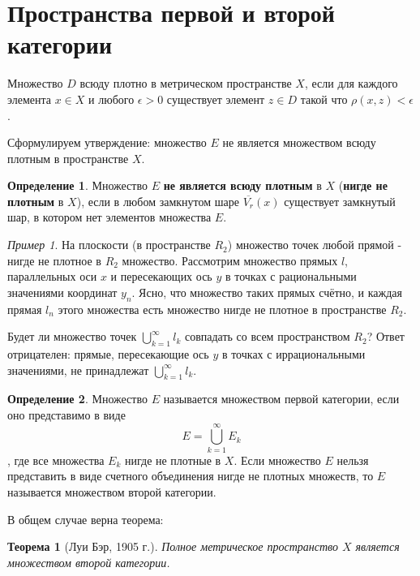 \documentclass[12pt,a4paper,titlepage]{book}
\theoremstyle{definition}
\newtheorem*{definition}{Определение}
\theoremstyle{plain}
\newtheorem*{theorem}{Теорема}
\theoremstyle{remark}
\theoremstyle{remark}
\newtheorem*{example}{Пример}
\theoremstyle{remark}
\theoremstyle{plain}
\begin{document}
\section{Пространства первой и второй категории}

Множество $D$ всюду плотно в метрическом пространстве $X$, если для каждого элемента $x \in X$ и любого $\epsilon > 0$ существует элемент $z \in D$ такой что
$\rho(x,z) < \epsilon$.

Сформулируем утверждение: множество $E$ не является множеством всюду плотным в пространстве $X$.

\begin{definition}
Множество $E$ \textbf{не является всюду плотным} в $X$ (\textbf{нигде не плотным} в $X$), если в любом замкнутом шаре $\overline{V_r}(x)$ существует замкнутый шар, в котором нет элементов множества $E$.
\end{definition}

\begin{example}
На плоскости (в пространстве $R_2$) множество точек любой прямой - нигде не плотное в $R_2$ множество.
Рассмотрим множество прямых $l$, параллельных оси $x$ и пересекающих ось $y$ в точках с рациональными значениями координат $y_n$. Ясно, что множество таких прямых счётно, и каждая прямая $l_n$ этого множества есть множество нигде не плотное в пространстве $R_2$.
\end{example}

Будет ли множество точек $\bigcup\limits_{k=1}^\infty l_k$ совпадать со всем пространством $R_2$? Ответ отрицателен: прямые, пересекающие ось $y$ в точках с иррациональными значениями, не принадлежат $\bigcup\limits_{k=1}^\infty l_k$.

\begin{definition}
Множество $E$ называется множеством первой категории, если оно представимо в виде 
$$E=\bigcup\limits_{k=1}^\infty E_k$$, 
где все множества $E_k$ нигде не плотные в $X$. Если множество $E$ нельзя представить в виде счетного объединения нигде не плотных множеств, то $E$ называется множеством второй категории.
\end{definition}

В общем случае верна теорема:

\begin{theorem}[Луи Бэр, 1905 г.]
Полное метрическое пространство $X$ является множеством второй категории.
\end{theorem}
\end{document}
